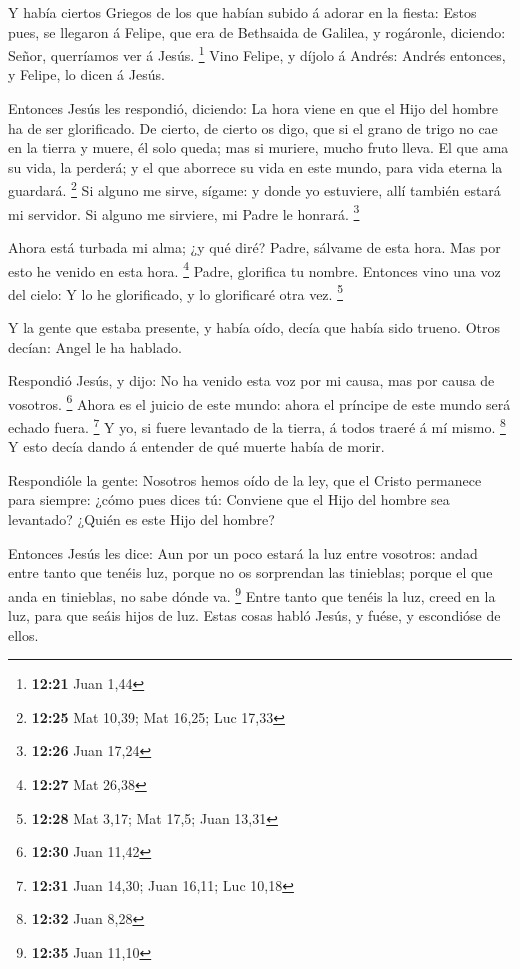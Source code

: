  Y había ciertos Griegos de los que habían subido á adorar
en la fiesta:  Estos pues, se llegaron á Felipe, que era de
Bethsaida de Galilea, y rogáronle, diciendo: Señor, querríamos ver á
Jesús. \footnote{\textbf{12:21} Juan 1,44}  Vino Felipe, y
díjolo á Andrés: Andrés entonces, y Felipe, lo dicen á Jesús.

 Entonces Jesús les respondió, diciendo: La hora viene en
que el Hijo del hombre ha de ser glorificado.  De cierto,
de cierto os digo, que si el grano de trigo no cae en la tierra y muere,
él solo queda; mas si muriere, mucho fruto lleva.  El que
ama su vida, la perderá; y el que aborrece su vida en este mundo, para
vida eterna la guardará. \footnote{\textbf{12:25} Mat 10,39; Mat 16,25;
  Luc 17,33}  Si alguno me sirve, sígame: y donde yo
estuviere, allí también estará mi servidor. Si alguno me sirviere, mi
Padre le honrará. \footnote{\textbf{12:26} Juan 17,24}

 Ahora está turbada mi alma; ¿y qué diré? Padre, sálvame de
esta hora. Mas por esto he venido en esta hora. \footnote{\textbf{12:27}
  Mat 26,38}  Padre, glorifica tu nombre. Entonces vino una
voz del cielo: Y lo he glorificado, y lo glorificaré otra vez.
\footnote{\textbf{12:28} Mat 3,17; Mat 17,5; Juan 13,31}

 Y la gente que estaba presente, y había oído, decía que
había sido trueno. Otros decían: Angel le ha hablado.

 Respondió Jesús, y dijo: No ha venido esta voz por mi
causa, mas por causa de vosotros. \footnote{\textbf{12:30} Juan 11,42}
 Ahora es el juicio de este mundo: ahora el príncipe de
este mundo será echado fuera. \footnote{\textbf{12:31} Juan 14,30; Juan
  16,11; Luc 10,18}  Y yo, si fuere levantado de la tierra,
á todos traeré á mí mismo. \footnote{\textbf{12:32} Juan 8,28}
 Y esto decía dando á entender de qué muerte había de
morir.

 Respondióle la gente: Nosotros hemos oído de la ley, que
el Cristo permanece para siempre: ¿cómo pues dices tú: Conviene que el
Hijo del hombre sea levantado? ¿Quién es este Hijo del hombre?

 Entonces Jesús les dice: Aun por un poco estará la luz
entre vosotros: andad entre tanto que tenéis luz, porque no os
sorprendan las tinieblas; porque el que anda en tinieblas, no sabe dónde
va. \footnote{\textbf{12:35} Juan 11,10}  Entre tanto que
tenéis la luz, creed en la luz, para que seáis hijos de luz. Estas cosas
habló Jesús, y fuése, y escondióse de ellos.


